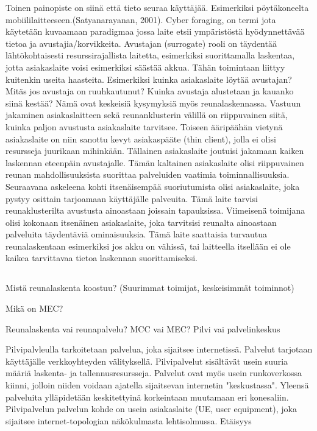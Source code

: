 \documentclass[finnish]{tktltiki2}
\theoremstyle{definition}
\theoremstyle{remark}
\begin{document}
Toinen painopiste on siinä että tieto seuraa käyttäjää. Esimerkiksi pöytäkoneelta mobiililaitteeseen.(Satyanarayanan, 2001).
Cyber foraging, on termi jota käytetään kuvaamaan paradigmaa jossa laite etsii ympäristöstä hyödynnettävää tietoa ja avustajia/korvikkeita. Avustajan (surrogate) rooli on täydentää lähtökohtaisesti resurssirajallista laitetta, esimerkiksi suorittamalla laskentaa, jotta asiakaslaite voisi esimerkiksi säästää akkua.
Tähän toimintaan liittyy kuitenkin useita haasteita. Esimerkiksi kuinka asiakaslaite löytää avustajan? Mitäs jos avustaja on ruuhkautunut? Kuinka avustaja alustetaan ja kauanko siinä kestää? 
Nämä ovat keskeisiä kysymyksiä myös reunalaskennassa. 
Vastuun jakaminen asiakaslaitteen sekä reunanklusterin välillä on riippuvainen siitä, kuinka paljon avustusta asiakaslaite tarvitsee. 
Toiseen ääripäähän vietynä asiakaslaite on niin sanottu kevyt asiakaspääte (thin client), jolla ei olisi resursseja juurikaan mihinkään. Tällainen asiakaslaite joutuisi jakamaan kaiken laskennan eteenpäin avustajalle. 
Tämän kaltainen asiakaslaite olisi riippuvainen reunan mahdollisuuksista suorittaa palveluiden vaatimia toiminnallisuuksia. 
Seuraavana askeleena kohti itsenäisempää suoriutumista olisi asiakaslaite, joka pystyy osittain tarjoamaan käyttäjälle palveuita. Tämä laite tarvisi reunaklusterilta avustusta ainoastaan joissain tapauksissa. 
Viimeisenä toimijana olisi kokonaan itsenäinen asiakaslaite, joka tarvitsisi reunalta ainoastaan palveluita täydentäviä ominaisuuksia.
Tämä laite saattaisia turvautua reunalaskentaan esimerkiksi jos akku on vähissä, tai laitteella itsellään ei ole kaikea tarvittavaa tietoa laskennan suorittamiseksi.

\subsection{}

Mistä reunalaskenta koostuu? (Suurimmat toimijat, keskeisimmät toiminnot)


Mikä on MEC?

Reunalaskenta vai reunapalvelu?
MCC vai MEC?
Pilvi vai palvelinkeskus

Pilvipalvleulla tarkoitetaan palvelua, joka sijaitsee internetissä. Palvelut tarjotaan käyttäjälle verkkoyhteyden välityksellä.
Pilvipalvelut sisältävät usein suuria määriä laskenta- ja tallennusresursseja. Palvelut ovat myös usein runkoverkossa kiinni, jolloin niiden voidaan ajatella sijaitsevan internetin "keskustassa".
Yleensä palveluita ylläpidetään keskitettyinä korkeintaan muutamaan eri konesaliin.
Pilvipalvelun palvelun kohde on usein asiakaslaite (UE, user equipment), joka sijaitsee internet-topologian näkökulmasta lehtisolmussa. Etäisyys 
\end{document}
